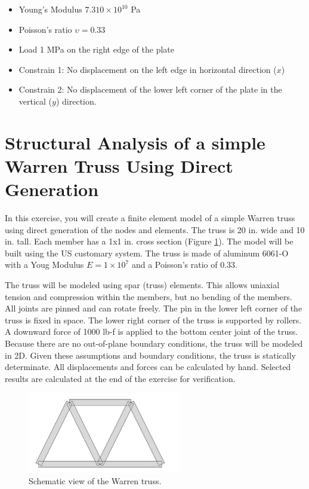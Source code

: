 \documentclass[letterpaper,pdftex]{article}
\begin{document}
\begin{itemize}
\item Young's Modulus $7.310 \times 10^10$ Pa
\item Poisson's ratio $\upsilon = 0.33$
\item Load 1 MPa on the right edge of the plate
\item Constrain 1: No displacement on the left edge in horizontal direction ($x$)
\item Constrain 2: No displacement of the lower left corner of the plate in the vertical ($y$) direction.
\end{itemize}


\section{Structural Analysis of a simple Warren Truss Using Direct Generation}

In this exercise, you will create a finite element model of a simple Warren truss using direct generation of the nodes and elements. The truss is 20 in. wide and 10 in. tall. Each member has a 1x1 in. cross section (Figure \ref{fig:warrentruss}).
%
The model will be built using the US customary system. The truss is made of aluminum  6061-O with a Youg Modulus  $E=1\times10^7$  and a Poisson’s ratio of $0.33$.

The truss will be modeled using spar (truss) elements. This allows uniaxial tension and compression within the members, but no bending of the members. All joints are pinned and can rotate freely. The pin in the lower left corner of the truss is fixed in space. The lower right corner of the truss is supported by rollers. A downward force of 1000 lb-f is applied to the bottom center joint of the truss. Because there are no out-of-plane boundary conditions, the truss will be modeled in 2D.
Given these assumptions and boundary conditions, the truss is statically determinate. All displacements and forces can be calculated by hand. Selected results are calculated at the end of the exercise for verification.


\begin{figure}[h]
   \centering
   \includegraphics[width=0.6\textwidth]{truss_example}
   \caption{Schematic view of the Warren truss.}
   \label{fig:warrentruss}
\end{figure}
\end{document}
